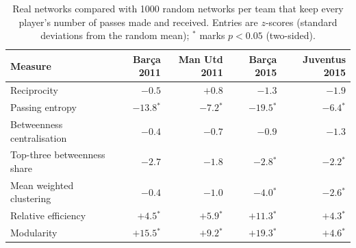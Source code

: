 \begin{table}[t]
\centering\small
\caption{Real networks compared with 1000 random networks per team that keep every player's number of passes made and received. Entries are $z$-scores (standard deviations from the random mean); $^{*}$ marks $p < 0.05$ (two-sided).}
\label{tab:null}
\begin{tabular}{lrrrr}
\toprule
Measure & Barça 2011 & Man Utd 2011 & Barça 2015 & Juventus 2015 \\
\midrule
Reciprocity & $-0.5$ & $+0.8$ & $-1.3$ & $-1.9$ \\
Passing entropy & $-13.8$$^{*}$ & $-7.2$$^{*}$ & $-19.5$$^{*}$ & $-6.4$$^{*}$ \\
Betweenness centralisation & $-0.4$ & $-0.7$ & $-0.9$ & $-1.3$ \\
Top-three betweenness share & $-2.7$ & $-1.8$ & $-2.8$$^{*}$ & $-2.2$$^{*}$ \\
Mean weighted clustering & $-0.4$ & $-1.0$ & $-4.0$$^{*}$ & $-2.6$$^{*}$ \\
Relative efficiency & $+4.5$$^{*}$ & $+5.9$$^{*}$ & $+11.3$$^{*}$ & $+4.3$$^{*}$ \\
Modularity & $+15.5$$^{*}$ & $+9.2$$^{*}$ & $+19.3$$^{*}$ & $+4.6$$^{*}$ \\
\bottomrule
\end{tabular}
\end{table}
